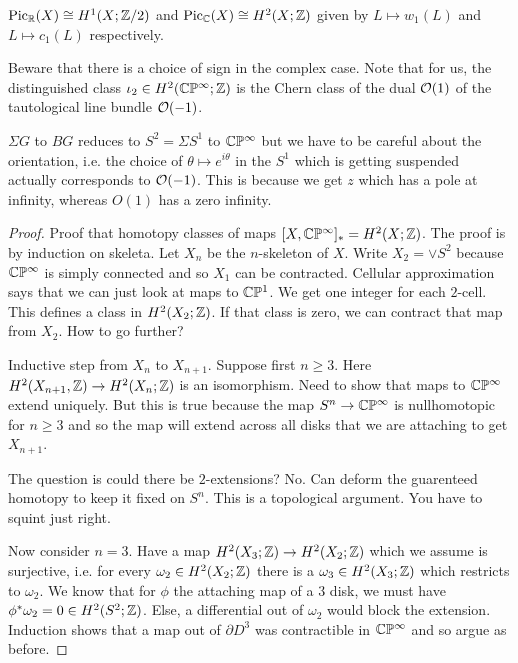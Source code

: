 \documentclass[12pt]{article}
\begin{document}
\begin{corollary}
    $\operatorname{Pic}_{\mathbb{R}}(X) \cong H^1(X; \mathbb{Z}/2)$ and $\operatorname{Pic}_{\mathbb{C}}(X) \cong H^2(X; \mathbb{Z})$ given by $L \mapsto w_1(L)$ and $L \mapsto c_1(L)$ respectively.
\end{corollary}

Beware that there is a choice of sign in the complex case. Note that for us, the distinguished class $\iota_2 \in H^2(\mathbb{C}\mathbb{P}^\infty; \mathbb{Z})$ is the Chern class of the dual ${\mathcal{O}}(1)$ of the tautological line bundle ${\mathcal{O}}(-1)$. 

\begin{remark}
    $\Sigma G$ to $BG$ reduces to $S^2 = \Sigma S^1$ to $\mathbb{C}\mathbb{P}^\infty$ but we have to be careful about the orientation, i.e. the choice of $\theta \mapsto e^{i\theta}$ in the $S^1$ which is getting suspended actually corresponds to ${\mathcal{O}}(-1)$. This is because we get $z$ which has a pole at infinity, whereas $O(1)$ has a zero infinity.
\end{remark}

\begin{proof}
    Proof that homotopy classes of maps $[X, \mathbb{C}\mathbb{P}^\infty]_* = H^2(X; \mathbb{Z})$. The proof is by induction on skeleta. Let $X_n$ be the $n$-skeleton of $X$. Write $X_2 = \vee S^2$ because $\mathbb{C}\mathbb{P}^\infty$ is simply connected and so $X_1$ can be contracted. Cellular approximation says that we can just look at maps to $\mathbb{C}\mathbb{P}^1$. We get one integer for each $2$-cell. This defines a class in $H^2(X_2; \mathbb{Z})$. If that class is zero, we can contract that map from $X_2$. How to go further?

    Inductive step from $X_n$ to $X_{n+1}$. Suppose first $n \geq 3$. Here $H^2(X_{n+1},\mathbb{Z}) \to H^2(X_n; \mathbb{Z})$ is an isomorphism. Need to show that maps to $\mathbb{C}\mathbb{P}^\infty$ extend uniquely. But this is true because the map $S^n \to \mathbb{C}\mathbb{P}^\infty$ is nullhomotopic for $n\geq 3$ and so the map will extend across all disks that we are attaching to get $X_{n+1}$.

    The question is could there be $2$-extensions? No. Can deform the guarenteed homotopy to keep it fixed on $S^n$. This is a topological argument. You have to squint just right.

    Now consider $n=3$. Have a map $H^2(X_3; \mathbb{Z}) \to H^2(X_2; \mathbb{Z})$ which we assume is surjective, i.e. for every $\omega_2 \in H^2(X_2; \mathbb{Z})$ there is a $\omega_3 \in H^2(X_3; \mathbb{Z})$ which restricts to $\omega_2$. We know that for $\phi$ the attaching map of a $3$ disk, we must have $\phi^* \omega_2 = 0 \in H^2(S^2; \mathbb{Z})$. Else, a differential out of $\omega_2$ would block the extension. Induction shows that a map out of $\partial D^3$ was contractible in $\mathbb{C}\mathbb{P}^\infty$ and so argue as before.
\end{proof}
\end{document}
